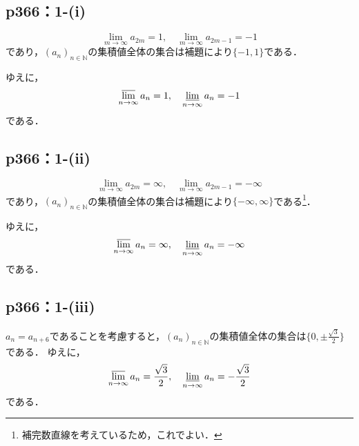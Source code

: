 \documentclass[a4paper,10pt,fleqn]{ltjsarticle}
\begin{document}
\subsection*{p366：1-(i)}

\begin{tleftbar}
    \[
        \lim_{m \to \infty} a_{2m} = 1 , \quad \lim_{m \to \infty} a_{2m-1} = -1
    \]
    であり，$(a_n)_{n \in \mathbb{N}}$の集積値全体の集合は補題により$\{ -1 , 1 \}$である．

    ゆえに，
    \[
        \varlimsup_{n \to \infty} a_n = 1 , \quad \varliminf_{n \to \infty} a_n =-1
    \]
    である．
\end{tleftbar}


\subsection*{p366：1-(ii)}

\begin{tleftbar}
    \[
        \lim_{m \to \infty} a_{2m} = \infty , \quad \lim_{m \to \infty} a_{2m-1} = -\infty
    \]
    であり，$(a_n)_{n \in \mathbb{N}}$の集積値全体の集合は補題により$\{ -\infty , \infty \}$である\footnote{補完数直線を考えているため，これでよい．}．

    ゆえに，
    \[
        \varlimsup_{n \to \infty} a_n = \infty , \quad \varliminf_{n \to \infty} a_n =-\infty 
    \]
    である．
\end{tleftbar}

\subsection*{p366：1-(iii)}

\begin{tleftbar}
    $ a_{n} = a_{n+6}$であることを考慮すると，$(a_n)_{n \in \mathbb{N}}$の集積値全体の集合は$\{ 0 , \pm \frac{\sqrt{3}}{2} \}$である．
    ゆえに，
    \[
        \varlimsup_{n \to \infty} a_n = \frac{\sqrt{3}}{2} , \quad \varliminf_{n \to \infty} a_n =-\frac{\sqrt{3}}{2}
    \]
    である．
\end{tleftbar}

\newpage 
\end{document}

